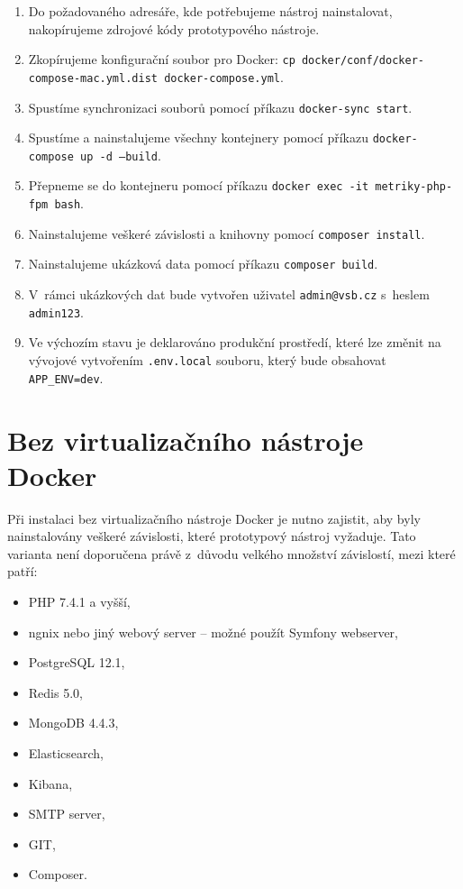 \documentclass[czech,master]{diploma}
\begin{document}
\begin{enumerate}
\item Do požadovaného adresáře, kde potřebujeme nástroj nainstalovat, nakopírujeme zdrojové kódy prototypového nástroje.
\item Zkopírujeme konfigurační soubor pro Docker: \texttt{cp docker/conf/docker-compose-mac.yml.dist docker-compose.yml}.
\item Spustíme synchronizaci souborů pomocí příkazu \texttt{docker-sync start}.
\item Spustíme a nainstalujeme všechny kontejnery pomocí příkazu \texttt{docker-compose up -d --build}.
\item Přepneme se do kontejneru pomocí příkazu \texttt{docker exec -it metriky-php-fpm bash}.
\item Nainstalujeme veškeré závislosti a knihovny pomocí \texttt{composer install}.
\item Nainstalujeme ukázková data pomocí příkazu \texttt{composer build}.
\item V~rámci ukázkových dat bude vytvořen uživatel \texttt{admin@vsb.cz} s~heslem \texttt{admin123}.
\item Ve výchozím stavu je deklarováno produkční prostředí, které lze změnit na vývojové vytvořením \texttt{.env.local} souboru, který bude obsahovat \texttt{APP\_ENV=dev}.
\end{enumerate}

\section{Bez virtualizačního nástroje Docker}
Při instalaci bez virtualizačního nástroje Docker je nutno zajistit, aby byly nainstalovány veškeré závislosti, které prototypový nástroj vyžaduje. Tato varianta není doporučena právě z~důvodu velkého množství závislostí, mezi které patří:
\begin{itemize}
\item PHP 7.4.1 a vyšší,
\item ngnix nebo jiný webový server -- možné použít Symfony webserver,
\item PostgreSQL 12.1,
\item Redis 5.0,
\item MongoDB 4.4.3,
\item Elasticsearch,
\item Kibana,
\item SMTP server,
\item GIT,
\item Composer.
\end{itemize}
\end{document}
